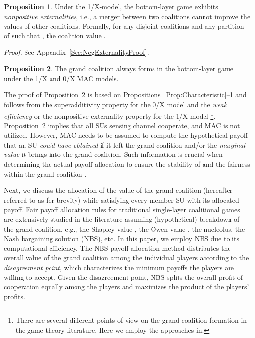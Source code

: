 \documentclass[journal,draftclsnofoot,onecolumn]{IEEEtran}
\theoremstyle{definition}
\newtheorem{Prop}{Proposition}
\begin{document}
\begin{Prop} \label{Prop:NegExternality}
Under the 1/X-model, the bottom-layer game  exhibits \emph{nonpositive externalities}\cite{Maskin}, i.e., a merger between two coalitions cannot improve the values of other coalitions. Formally, for any disjoint coalitions  and any partition  of  such that  , the coalition value
.
\end{Prop}
\begin{proof}
See Appendix~\ref{Sec:NegExternalityProof}.
\end{proof}

\begin{Prop}\label{Prop:GrandCoalFormation}
The grand coalition always forms in the bottom-layer game under the 1/X and 0/X MAC models.
\end{Prop}
The proof of Proposition~\ref{Prop:GrandCoalFormation} is based on Propositions~\ref{Prop:Characteristic}--\ref{Prop:NegExternality} and follows from the superadditivity property \cite{CoalGameSurvey} for the 0/X model and the \emph{weak efficiency} or the nonpositive externality property \cite{Maskin, Efficiency} for the 1/X model \cite{YLuCISS}\footnote{There are several different points of view on the grand coalition formation in the game theory literature. Here we employ the approaches in\cite{CoalGameSurvey,Maskin, Efficiency}.}. Proposition~\ref{Prop:GrandCoalFormation} implies that all SUs sensing channel  cooperate, and MAC is not utilized. However, MAC needs to be assumed to compute the hypothetical payoff that an SU \emph{could have obtained} if it left the grand coalition and/or the \emph{marginal value} it brings into the grand coalition. Such information is crucial when determining the actual payoff allocation to ensure the stability of and the fairness within the grand coalition \cite{GameSurvey}.


Next, we discuss the allocation of the value of the grand coalition  (hereafter referred to as  for brevity) while satisfying every member SU with its allocated payoff. Fair payoff allocation rules for traditional single-layer coalitional games are extensively studied in the literature assuming (hypothetical) breakdown of the grand coalition, e.g., the Shapley value \cite{CoalGameSurvey}, the Owen value \cite{Owen}, the nucleolus\cite{CoalGameSurvey}, the Nash bargaining solution (NBS)\cite{NBS,NBSNeg}, etc. In this paper, we employ NBS due to its computational efficiency\cite{NBS}. The NBS payoff allocation method distributes the overall value of the grand coalition among the individual players according to the \emph{disagreement point}, which characterizes the minimum payoffs the players are willing to accept. Given the disagreement point, NBS splits the overall profit of cooperation equally among the players and maximizes the product of the players' profits\cite{NBS}.
\end{document}
